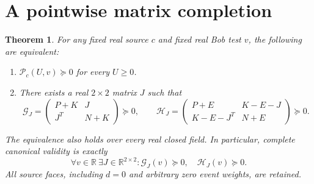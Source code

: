\documentclass[11pt]{article}
\newtheorem{theorem}{Theorem}
\newcommand{\PSD}{\succeq0}
\newcommand{\R}{\mathbb R}
\begin{document}
\section{A pointwise matrix completion}
\begin{theorem}\label{thm:selector}
For any fixed real source $c$ and fixed real Bob test $v$, the following are
equivalent:
\begin{enumerate}
\item $\mathcal P_c(U,v)\PSD$ for every $U\geq0$.
\item There exists a real $2\times2$ matrix $J$ such that
\begin{equation}
\boxed{\mathcal G_J=
\begin{pmatrix}P+K&J\\J^T&N+K\end{pmatrix}\PSD,
\qquad
\mathcal H_J=
\begin{pmatrix}P+E&K-E-J\\K-E-J^T&N+E\end{pmatrix}\PSD.}\label{lmis}
\end{equation}
\end{enumerate}
The equivalence also holds over every real closed field.  In particular,
complete canonical validity is exactly
\begin{equation}
\boxed{\forall v\in\R\ \exists J\in\R^{2\times2}:
\mathcal G_J(v)\PSD,\quad\mathcal H_J(v)\PSD.}\label{quantifiers}
\end{equation}
All source faces, including $d=0$ and arbitrary zero event weights, are retained.
\end{theorem}
\end{document}
